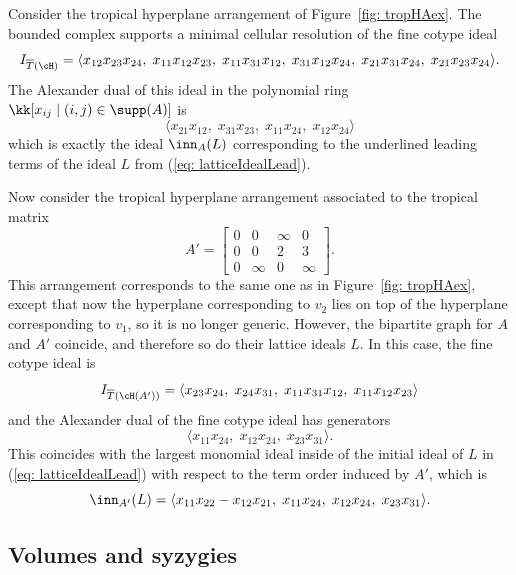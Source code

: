 \begin{example}\label{ex: cellRes} Consider the tropical hyperplane arrangement of Figure~\ref{fig: tropHAex}. The bounded complex supports a minimal cellular resolution of the fine cotype ideal
$$
I_{\overline T(\cH)} = \langle x_{12}x_{23}x_{24}, \; x_{11}x_{12}x_{23}, \; x_{11} x_{31} x_{12}, \; x_{31} x_{12} x_{24}, \; x_{21} x_{31} x_{24}, \; x_{21} x_{23} x_{24} \rangle.
$$
The Alexander dual of this ideal in the polynomial ring $\kk[x_{ij} \mid (i,j)\in\supp(A)]$ is
$$\langle {x}_{21}{x}_{12}, \; {x}_{31}{x}_{23},\; {x}_{
     11}{x}_{24},\; {x}_{12}{x}_{24} \rangle$$
which is exactly the ideal $\inn_A(L)$ corresponding to the underlined leading terms of the ideal $L$ from (\ref{eq: latticeIdealLead}).
\end{example}

\begin{example}\label{ex: cellResNonGeneric} Now consider the tropical hyperplane arrangement associated to the tropical matrix
$$
A' = \begin{bmatrix}
0 & 0 & \infty & 0 \\
0 & 0 & 2 & 3 \\
0 & \infty & 0 & \infty
\end{bmatrix}.
$$
This arrangement corresponds to the same one as in Figure~\ref{fig: tropHAex}, except that now the hyperplane corresponding to $v_2$ lies on top of the hyperplane corresponding to $v_1$, so it is no longer generic. However, the bipartite graph for $A$ and $A'$ coincide, and therefore so do their lattice ideals $L$. In this case, the fine cotype ideal is
$$
I_{\overline{T}(\cH(A'))} = \langle x_{23} x_{24}, \; x_{24} x_{31}, \; x_{11} x_{31} x_{12}, \; x_{11} x_{12} x_{23} \rangle 
$$
and the Alexander dual of the fine cotype ideal has generators
$$
\langle x_{11} x_{24}, \; x_{12} x_{24}, \; x_{23} x_{31} \rangle. 
$$
This coincides with the largest monomial ideal inside of the initial ideal of $L$ in (\ref{eq: latticeIdealLead}) with respect to the term order induced by $A'$, which is
$$
\inn_{A'}(L) = \langle x_{11} x_{22} - x_{12} x_{21}, \; x_{11} x_{24}, \; x_{12} x_{24}, \; x_{23} x_{31} \rangle.
$$
\end{example}

\subsection{Volumes and syzygies}\label{sec: dimension}



